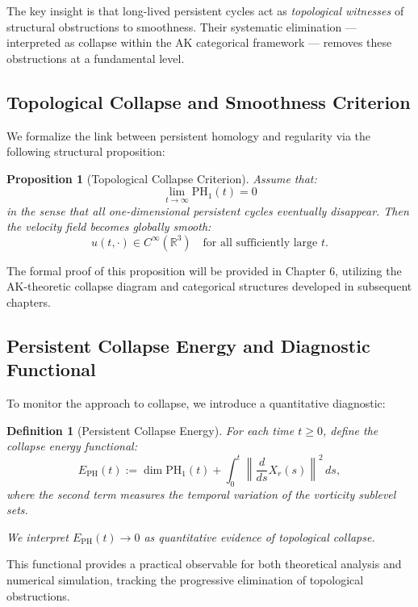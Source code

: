 \documentclass[11pt]{article}
\newtheorem{definition}[theorem]{Definition}
\newtheorem{proposition}[theorem]{Proposition}
\begin{document}
The key insight is that long-lived persistent cycles act as \emph{topological witnesses} of structural obstructions to smoothness. Their systematic elimination — interpreted as collapse within the AK categorical framework — removes these obstructions at a fundamental level.

\subsection{Topological Collapse and Smoothness Criterion}

We formalize the link between persistent homology and regularity via the following structural proposition:

\begin{proposition}[Topological Collapse Criterion]
\label{prop:PHcollapse}
Assume that:
\[
\lim_{t \to \infty} \mathrm{PH}_1(t) = 0
\]
in the sense that all one-dimensional persistent cycles eventually disappear. Then the velocity field becomes globally smooth:
\[
u(t, \cdot) \in C^\infty(\mathbb{R}^3) \quad \text{for all sufficiently large } t.
\]
\end{proposition}

The formal proof of this proposition will be provided in Chapter 6, utilizing the AK-theoretic collapse diagram and categorical structures developed in subsequent chapters.

\subsection{Persistent Collapse Energy and Diagnostic Functional}

To monitor the approach to collapse, we introduce a quantitative diagnostic:

\begin{definition}[Persistent Collapse Energy]
For each time \( t \geq 0 \), define the collapse energy functional:
\[
E_{\mathrm{PH}}(t) := \dim \mathrm{PH}_1(t) + \int_0^t \left\| \frac{d}{ds} X_r(s) \right\|^2 \, ds,
\]
where the second term measures the temporal variation of the vorticity sublevel sets.

We interpret \( E_{\mathrm{PH}}(t) \to 0 \) as quantitative evidence of topological collapse.
\end{definition}

This functional provides a practical observable for both theoretical analysis and numerical simulation, tracking the progressive elimination of topological obstructions.
\end{document}
